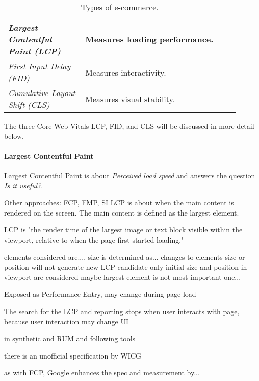\begin{table}[h]
	\small
	\centering
	\begin{tabular}{  p{0.3\linewidth} | p{0.6\linewidth} }
	\textit{Largest Contentful Paint (LCP)} & Measures loading performance.  \\
	\hline
	\textit{First Input Delay (FID)} & Measures interactivity. \\
	\hline
	\textit{Cumulative Layout Shift (CLS)} & Measures visual stability.  \\
	\end{tabular}
	\medskip
	\caption{Types of e-commerce.}
	\label{table:types_ecommerce}
\end{table}

The three Core Web Vitals LCP, FID, and CLS will be discussed in more detail below.





\paragraph{Largest Contentful Paint}


Largest Contentful Paint is about \textit{Perceived load speed} and answers the question \textit{Is it useful?}.

Other approaches: FCP, FMP, SI
LCP is about when the main content is rendered on the screen.
The main content is defined as the largest element.

LCP is "the render time of the largest image or text block visible within the viewport, relative to when the page first started loading."

elements considered are....
size is determined as...
changes to elements size or position will not generate new LCP candidate
only initial size and position in viewport are considered
maybe largest element is not most important one...

Exposed as Performance Entry, may change during page load

The search for the LCP and reporting stops when user interacts with page, because user interaction may change UI

in synthetic and RUM and following tools



there is an unofficial specification by WICG %

as with FCP, Google enhances the spec and measurement by...

